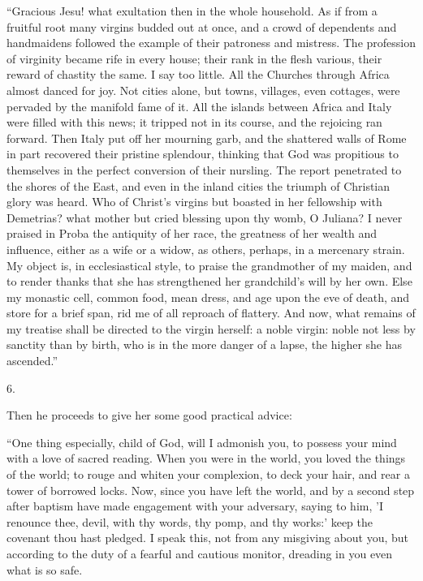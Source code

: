 ``Gracious Jesu! what exultation then in the whole household.
As if from a fruitful root many virgins budded out at once, and a
crowd of dependents and handmaidens followed the example of their
patroness and mistress. The profession of virginity became rife in
every house; their rank in the flesh various, their reward of chastity
the same. I say too little. All the Churches through Africa almost
danced for joy. Not cities alone, but towns, villages, even cottages,
were pervaded by the manifold fame of it. All the islands between
Africa and Italy were filled with this news; it tripped not in its
course, and the rejoicing ran forward. Then Italy put off her mourning
garb, and the shattered walls of Rome in part recovered their pristine
splendour, thinking that God was propitious to themselves in the
perfect conversion of their nursling. The report penetrated to the
shores of the East, and even in the inland cities the triumph of
Christian glory was heard. Who of Christ's virgins but boasted in her
fellowship with Demetrias? what mother but cried blessing upon thy
womb, O Juliana? I never praised in Proba the antiquity of her race,
the greatness of her wealth and influence, either as a wife or a
widow, as others, perhaps, in a mercenary strain. My object is, in
ecclesiastical style, to praise the grandmother of my maiden, and to
render thanks that she has strengthened her grandchild's will by her
own. Else my monastic cell, common food, mean dress, and age upon the
eve of death, and store for a brief span, rid me of all reproach of
flattery. And now, what remains of my treatise shall be directed to
the virgin herself: a noble virgin: noble not less by sanctity
than by birth, who is in the more danger of a
lapse, the higher she has ascended.''

6.

Then he proceeds to give her some good practical advice:

``One thing especially, child of God, will I admonish you, to
possess your mind with a love of sacred reading. When you were in the
world, you loved the things of the world; to rouge and whiten your
complexion, to deck your hair, and rear a tower of borrowed locks.
Now, since you have left the world, and by a second step after baptism
have made engagement with your adversary, saying to him, 'I renounce
thee, devil, with thy words, thy pomp, and thy works:' keep the
covenant thou hast pledged. I speak this, not from any misgiving about
you, but according to the duty of a fearful and cautious monitor,
dreading in you even what is so safe.

